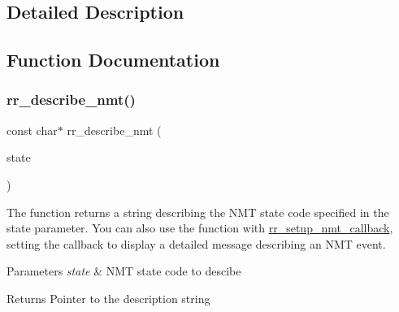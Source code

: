 \subsection{Detailed Description}


\subsection{Function Documentation}
\mbox{\label{group___state_ga91beec8d2ca8ea03583c21a285297861}} 
\subsubsection{\texorpdfstring{rr\+\_\+describe\+\_\+nmt()}{rr\_describe\_nmt()}}
{\footnotesize\ttfamily const char$\ast$ rr\+\_\+describe\+\_\+nmt (\begin{DoxyParamCaption}\item[{\hyperlink{api_8h_afaf255d20b35be64a488b42e11feab29}{rr\+\_\+nmt\+\_\+state\+\_\+t}}]{state }\end{DoxyParamCaption})}



The function returns a string describing the N\+MT state code specified in the \textquotesingle{}state\textquotesingle{} parameter. You can also use the function with \hyperlink{group___state_ga2433f49950ad40f06537287b52852c13}{rr\+\_\+setup\+\_\+nmt\+\_\+callback}, setting the callback to display a detailed message describing an N\+MT event. 


\begin{DoxyParams}{Parameters}
{\em state} & N\+MT state code to descibe \\
\hline
\end{DoxyParams}
\begin{DoxyReturn}{Returns}
Pointer to the description string 
\end{DoxyReturn}
\mbox{\label{group___state_ga3141174e38250e0107cc6de9681bcc47}} 

